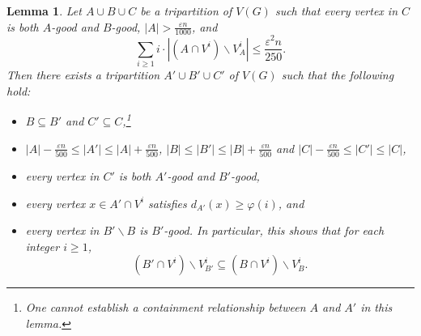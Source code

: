 \documentclass[10pt,a4paper]{amsart}
\newtheorem{lemma}{Lemma}
\begin{document}
	\begin{lemma}
		\label{Lem:indegree-tripar2}
		Let $A\cup B\cup C$ be a tripartition of $V(G)$ such that every vertex in $C$ is both $A$-good and $B$-good, $|A|>\frac{\varepsilon n}{1000}$, and
		\begin{equation}
			\label{equ:indegree condition2}
			\sum_{i\ge 1} i\cdot |(A\cap V^i)\backslash V^i_A|\le \frac{\varepsilon^2n}{250}.
		\end{equation}
		Then there exists a tripartition $A'\cup B'\cup C'$ of $V(G)$ such that the following hold:
		\begin{itemize}
			\item[(2a).] $B\subseteq B'$ and $C'\subseteq C$,\footnote{One cannot establish a containment relationship between $A$ and $A'$ in this lemma.}
			\item[(2b).] $|A|-\frac{\varepsilon n}{500}\le |A'|\le |A|+\frac{\varepsilon n}{500}$, $|B|\leq |B'|\leq |B|+\frac{\varepsilon n}{500}$ and $|C|-\frac{\varepsilon n}{500}\leq |C'|\leq |C|$,
			\item[(2c).] every vertex in $C'$ is both $A'$-good and $B'$-good,
			\item[(2d).] every vertex $x\in A'\cap V^i$ satisfies $d_{A'}(x)\ge \varphi(i)$, and
			\item[(2e).] every vertex in $B'\backslash B$ is $B'$-good. In particular, this shows that for each integer $i\geq 1$,
			\begin{equation}\label{equ:indeg B'}
				(B'\cap V^i)\backslash V^i_{B'}\subseteq (B\cap V^i)\backslash V^i_B.
			\end{equation}
		\end{itemize}
	\end{lemma}
\end{document}
